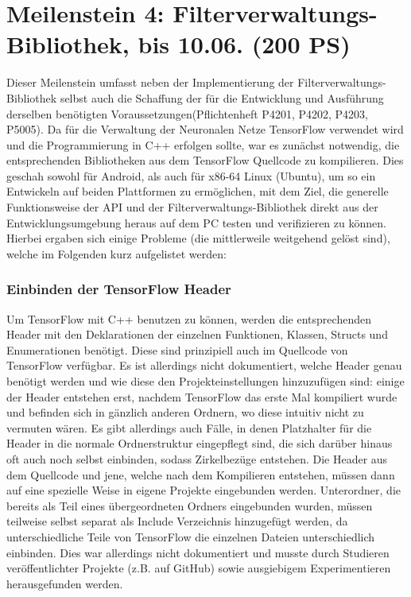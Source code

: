 \documentclass[12pt,a4paper,ngerman,enabledeprecatedfontcommands]{scrreprt}
\begin{document}
\section[Meilenstein 4: Filterverwaltungs-Bibliothek]{Meilenstein 4: Filterverwaltungs-Bibliothek, bis 10.06. (200 PS)}
Dieser Meilenstein umfasst neben der Implementierung der \gls{Filterverwaltungs-Bibliothek} selbst auch die Schaffung der für die Entwicklung und Ausführung derselben benötigten Voraussetzungen(Pflichtenheft P4201, P4202, P4203, P5005). Da für die Verwaltung der Neuronalen Netze TensorFlow verwendet wird und die Programmierung in C++ erfolgen sollte, war es zunächst notwendig, die entsprechenden Bibliotheken aus dem TensorFlow Quellcode zu kompilieren. Dies geschah sowohl für Android, als auch für x86-64 Linux (Ubuntu), um so ein Entwickeln auf beiden Plattformen zu ermöglichen, mit dem Ziel, die generelle Funktionsweise der \gls{API} und der \gls{Filterverwaltungs-Bibliothek} direkt aus der Entwicklungsumgebung heraus auf dem PC testen und verifizieren zu können. 
Hierbei ergaben sich einige Probleme (die mittlerweile weitgehend gelöst sind), welche im Folgenden kurz aufgelistet werden:\\

\subsubsection{Einbinden der TensorFlow Header}
Um TensorFlow mit C++ benutzen zu können, werden die entsprechenden Header mit den Deklarationen der einzelnen Funktionen, Klassen, Structs und Enumerationen benötigt. Diese sind prinzipiell auch im Quellcode von TensorFlow verfügbar. Es ist allerdings nicht dokumentiert, welche Header genau benötigt werden und wie diese den Projekteinstellungen hinzuzufügen sind: einige der Header entstehen erst, nachdem TensorFlow das erste Mal kompiliert wurde und befinden sich in gänzlich anderen Ordnern, wo diese intuitiv nicht zu vermuten wären. Es gibt allerdings auch Fälle, in denen Platzhalter für die Header in die normale Ordnerstruktur eingepflegt sind, die sich darüber hinaus oft auch noch selbst einbinden, sodass Zirkelbezüge entstehen. Die Header aus dem Quellcode und jene, welche nach dem Kompilieren entstehen, müssen dann auf eine spezielle Weise in eigene Projekte eingebunden werden. Unterordner, die bereits als Teil eines übergeordneten Ordners eingebunden wurden, müssen teilweise selbst separat als \glqq{}Include Verzeichnis\grqq{} hinzugefügt werden, da unterschiedliche Teile von TensorFlow die einzelnen Dateien unterschiedlich einbinden. Dies war allerdings nicht dokumentiert und musste durch Studieren veröffentlichter Projekte (z.B. auf GitHub) sowie ausgiebigem Experimentieren herausgefunden werden.\\
\end{document}
